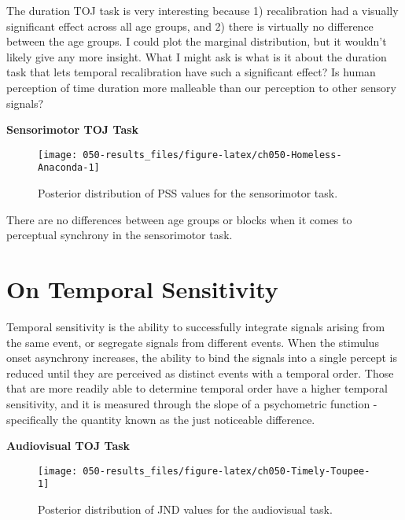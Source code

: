 \documentclass[11pt, oneside, openany]{scrbook}
\begin{document}
The duration TOJ task is very interesting because 1) recalibration had a visually significant effect across all age groups, and 2) there is virtually no difference between the age groups. I could plot the marginal distribution, but it wouldn't likely give any more insight. What I might ask is what is it about the duration task that lets temporal recalibration have such a significant effect? Is human perception of time duration more malleable than our perception to other sensory signals?

\textbf{Sensorimotor TOJ Task}

\begin{figure}

{\centering \texttt{[image: 050-results\_files/figure-latex/ch050-Homeless-Anaconda-1]} 

}

\caption{Posterior distribution of PSS values for the sensorimotor task.}\label{fig:ch050-Homeless-Anaconda}
\end{figure}

There are no differences between age groups or blocks when it comes to perceptual synchrony in the sensorimotor task.

\hypertarget{on-temporal-sensitivity}{%
\section{On Temporal Sensitivity}\label{on-temporal-sensitivity}}

Temporal sensitivity is the ability to successfully integrate signals arising from the same event, or segregate signals from different events. When the stimulus onset asynchrony increases, the ability to bind the signals into a single percept is reduced until they are perceived as distinct events with a temporal order. Those that are more readily able to determine temporal order have a higher temporal sensitivity, and it is measured through the slope of a psychometric function - specifically the quantity known as the just noticeable difference.

\textbf{Audiovisual TOJ Task}

\begin{figure}

{\centering \texttt{[image: 050-results\_files/figure-latex/ch050-Timely-Toupee-1]} 

}

\caption{Posterior distribution of JND values for the audiovisual task.}\label{fig:ch050-Timely-Toupee}
\end{figure}
\end{document}
